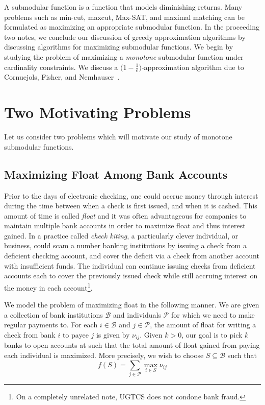 \documentclass{article}
\begin{document}

A submodular function is a function that models diminishing returns. Many problems such as min-cut, maxcut, Max-SAT, and maximal matching can be formulated as maximizing an appropriate submodular function. In the proceeding two notes, we conclude our discussion of greedy approximation algorithms by discussing algorithms for maximizing submodular functions. We begin by studying the problem of maximizing a \emph{monotone} submodular function under cardinality constraints. We discuss a $\big( 1 - \frac{1}{e} \big)$-approximation algorithm due to Cornuejols, Fisher, and Nemhauser~\cite{CFN77}.

\section{Two Motivating Problems}

Let us consider two problems which will motivate our study of monotone submodular functions.

\subsection{Maximizing Float Among Bank Accounts}

Prior to the days of electronic checking, one could accrue money through interest during the time between when a check is first issued, and when it is cashed. This amount of time is called \emph{float} and it was often advantageous for companies to maintain multiple bank accounts in order to maximize float and thus interest gained. In a practice called \emph{check kiting}, a particularly clever individual, or business, could scam a number banking institutions by issuing a check from a deficient checking account, and cover the deficit via a check from another account with insufficient funds. The individual can continue issuing checks from deficient accounts each to cover the previously issued check while still accruing interest on the money in each account\footnote{On a completely unrelated note, UGTCS does not condone bank fraud.}.

We model the problem of maximizing float in the following manner. We are given a collection of bank institutions $\mathcal{B}$ and individuals $\mathcal{P}$ for which we need to make regular payments to. For each $i \in \mathcal{B}$ and $j \in \mathcal{P}$, the amount of float for writing a check from bank $i$ to payee $j$ is given by $\nu_{ij}$. Given $k > 0$, our goal is to pick $k$ banks to open accounts at such that the total amount of float gained from paying each individual is maximized. More precisely, we wish to choose $S \subseteq \mathcal{B}$ such that
\begin{equation*}
f(S) = \sum_{j \in \mathcal{P}} \max_{i \in S} \nu_{ij}
\end{equation*}
\end{document}
